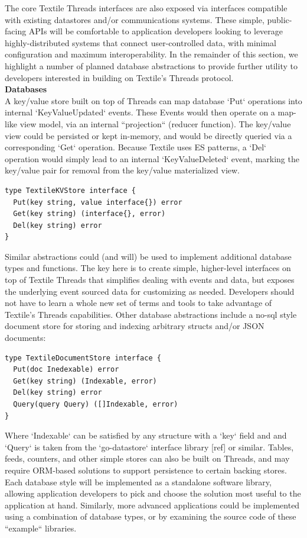 \documentclass{comjnl}
\begin{document}
The core Textile Threads interfaces are also exposed via interfaces compatible with existing datastores and/or communications systems. These simple, public-facing APIs will be comfortable to application developers looking to leverage highly-distributed systems that connect user-controlled data, with minimal configuration and maximum interoperability. In the remainder of this section, we highlight a number of planned database abstractions to provide further utility to developers interested in building on Textile’s Threads protocol.\\

\textbf{Databases} \\

A key/value store built on top of Threads can map database `Put` operations into internal `KeyValueUpdated` events. These Events would then operate on a map-like view model, via an internal “projection“ (reducer function). The key/value view could be persisted or kept in-memory, and would be directly queried via a corresponding `Get` operation. Because Textile uses ES patterns, a `Del` operation would simply lead to an internal `KeyValueDeleted` event, marking the key/value pair for removal from the key/value materialized view.

\begin{lstlisting}
type TextileKVStore interface {
  Put(key string, value interface{}) error
  Get(key string) (interface{}, error)
  Del(key string) error
}
\end{lstlisting}

Similar abstractions could (and will) be used to implement additional database types and functions. The key here is to create simple, higher-level interfaces on top of Textile Threads that simplifies dealing with events and data, but exposes the underlying event sourced data for customizing as needed. Developers should not have to learn a whole new set of terms and tools to take advantage of Textile’s Threads capabilities. Other database abstractions include a no-sql style document store for storing and indexing arbitrary structs and/or JSON documents:

\begin{lstlisting}
type TextileDocumentStore interface {
  Put(doc Inedexable) error
  Get(key string) (Indexable, error)
  Del(key string) error
  Query(query Query) ([]Indexable, error)
}
\end{lstlisting}

Where `Indexable` can be satisfied by any structure with a  `key` field and and `Query` is taken from the `go-datastore` interface library [ref] or similar. Tables, feeds, counters, and other simple stores can also be built on Threads, and may require ORM-based solutions to support persistence to certain backing stores. Each database style will be implemented as a standalone software library, allowing application developers to pick and choose the solution most useful to the application at hand. Similarly, more advanced applications could be implemented using a combination of database types, or by examining the source code of these “example“ libraries.\\
\end{document}
